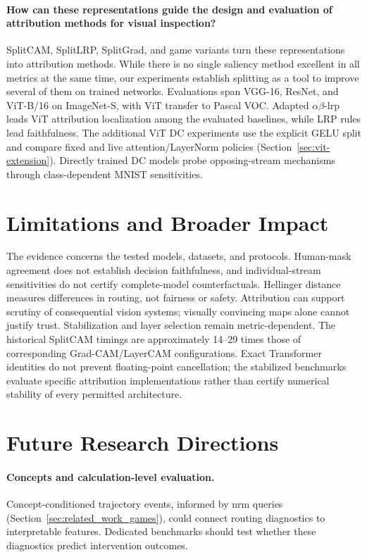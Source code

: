 \paragraph{How can these representations guide the design and evaluation of attribution methods for visual inspection?}
SplitCAM, SplitLRP, SplitGrad, and game variants turn these representations into attribution methods. While there is no single saliency method excellent in all metrics at the same time, our experiments establish splitting as a tool to improve several of them on trained networks. Evaluations span VGG-16, ResNet, and ViT-B/16 on ImageNet-S, with ViT transfer to Pascal VOC. Adapted $\alpha\beta$-\ac{lrp} leads ViT attribution localization among the evaluated baselines, while LRP rules lead faithfulness. The additional ViT DC experiments use the explicit GELU split and compare fixed and live attention/LayerNorm policies (Section~\ref{sec:vit-extension}). Directly trained DC models probe opposing-stream mechanisms through class-dependent MNIST sensitivities.

\section{Limitations and Broader Impact}\label{sec:limitations}\label{sec:broader_impact}\label{ptnb:app:broader-impact}

The evidence concerns the tested models, datasets, and protocols. Human-mask agreement does not establish decision faithfulness, and individual-stream sensitivities do not certify complete-model counterfactuals. Hellinger distance measures differences in routing, not fairness or safety. Attribution can support scrutiny of consequential vision systems; visually convincing maps alone cannot justify trust. Stabilization and layer selection remain metric-dependent. The historical SplitCAM timings are approximately 14--29 times those of corresponding Grad-CAM/LayerCAM configurations. Exact Transformer identities do not prevent floating-point cancellation; the stabilized benchmarks evaluate specific attribution implementations rather than certify numerical stability of every permitted architecture.

\section{Future Research Directions}\label{sec:future_directions}

\paragraph{Concepts and calculation-level evaluation.}
Concept-conditioned trajectory events, informed by \ac{nrm} queries (Section~\ref{sec:related_work_games}), could connect routing diagnostics to interpretable features. Dedicated benchmarks should test whether these diagnostics predict intervention outcomes.

